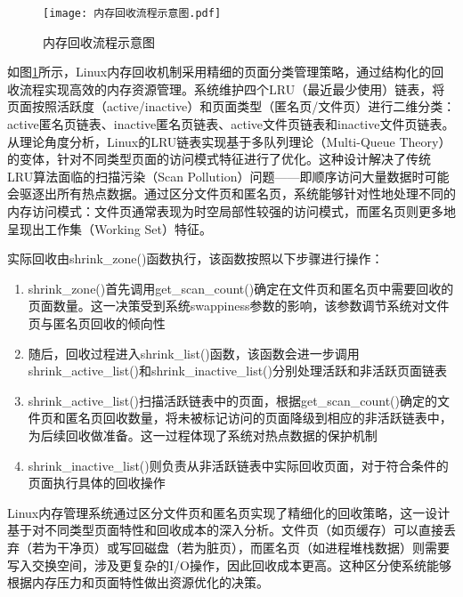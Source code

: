 \begin{figure}[h]
    \centering
    \texttt{[image: 内存回收流程示意图.pdf]}
    \caption{内存回收流程示意图}
    \label{fig:memory_reclaim_mechanism}
\end{figure}

如图\ref{fig:memory_reclaim_mechanism}所示，Linux内存回收机制采用精细的页面分类管理策略，通过结构化的回收流程实现高效的内存资源管理。系统维护四个LRU（最近最少使用）链表，将页面按照活跃度（active/inactive）和页面类型（匿名页/文件页）进行二维分类：active匿名页链表、inactive匿名页链表、active文件页链表和inactive文件页链表。从理论角度分析，Linux的LRU链表实现基于多队列理论（Multi-Queue Theory）的变体，针对不同类型页面的访问模式特征进行了优化。这种设计解决了传统LRU算法面临的扫描污染（Scan Pollution）问题——即顺序访问大量数据时可能会驱逐出所有热点数据。通过区分文件页和匿名页，系统能够针对性地处理不同的内存访问模式：文件页通常表现为时空局部性较强的访问模式，而匿名页则更多地呈现出工作集（Working Set）特征。

实际回收由shrink\_zone()函数执行，该函数按照以下步骤进行操作：

\begin{enumerate}
    \item shrink\_zone()首先调用get\_scan\_count()确定在文件页和匿名页中需要回收的页面数量。这一决策受到系统swappiness参数的影响，该参数调节系统对文件页与匿名页回收的倾向性
  
    \item 随后，回收过程进入shrink\_list()函数，该函数会进一步调用shrink\_active\_list()和shrink\_inactive\_list()分别处理活跃和非活跃页面链表
  
    \item shrink\_active\_list()扫描活跃链表中的页面，根据get\_scan\_count()确定的文件页和匿名页回收数量，将未被标记访问的页面降级到相应的非活跃链表中，为后续回收做准备。这一过程体现了系统对热点数据的保护机制
  
    \item shrink\_inactive\_list()则负责从非活跃链表中实际回收页面，对于符合条件的页面执行具体的回收操作
\end{enumerate}

Linux内存管理系统通过区分文件页和匿名页实现了精细化的回收策略，这一设计基于对不同类型页面特性和回收成本的深入分析。文件页（如页缓存）可以直接丢弃（若为干净页）或写回磁盘（若为脏页），而匿名页（如进程堆栈数据）则需要写入交换空间，涉及更复杂的I/O操作，因此回收成本更高。这种区分使系统能够根据内存压力和页面特性做出资源优化的决策。

